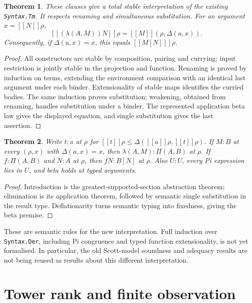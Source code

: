 \documentclass[11pt]{article}
\newtheorem{theorem}{Theorem}[section]
\newcommand{\llbracket}{[\![}
\newcommand{\rrbracket}{]\!]}
\begin{document}
\begin{theorem}
These clauses give a total stable interpretation of the existing
\texttt{Syntax.Tm}. It respects renaming and simultaneous substitution.
For an argument $x=\llbracket N\rrbracket\rho$,
\[
 \llbracket(\lambda(A,M))N\rrbracket\rho
   =\llbracket M\rrbracket(\rho,\Delta(a,x)).
\]
Consequently, if $\Delta(a,x)=x$, this equals
$\llbracket M[N]\rrbracket\rho$.
\end{theorem}
\begin{proof}
All constructors are stable by composition, pairing and currying;
input restriction is jointly stable in the projection and function.
Renaming is proved by induction on terms, extending the environment
comparison with an identical last argument under each binder.
Extensionality of stable maps identifies the curried bodies. The same
induction proves substitution; weakening, obtained from renaming,
handles substitution under a binder. The represented application beta
law gives the displayed equation, and single substitution gives the
last assertion.
\end{proof}

\begin{theorem}
Write $t:a$ at $\rho$ for
$\llbracket t\rrbracket\rho\le
\Delta(\llbracket a\rrbracket\rho,\llbracket t\rrbracket\rho)$.
If $M:B$ at every $(\rho,x)$ with $\Delta(a,x)=x$, then
$\lambda(A,M):\Pi(A,B)$ at $\rho$. If
$f:\Pi(A,B)$ and $N:A$ at $\rho$, then $fN:B[N]$ at $\rho$.
Also $U:U$, every Pi expression lies in $U$, and beta holds at typed
arguments.
\end{theorem}
\begin{proof}
Introduction is the greatest-supported-section abstraction theorem;
elimination is its application theorem, followed by semantic single
substitution in the result type. Deflationarity turns semantic typing
into fixedness, giving the beta premise.
\end{proof}

These are semantic rules for the new interpretation. Full induction over
\texttt{Syntax.Der}, including Pi congruence and typed function
extensionality, is not yet formalised. In particular, the old Scott-model
soundness and adequacy results are not being reused as results about this
different interpretation.

\section{Tower rank and finite observation}
\end{document}
